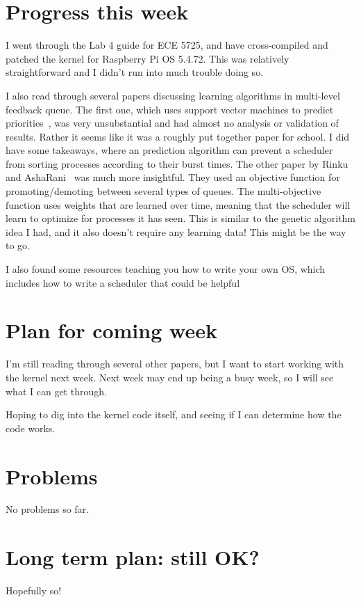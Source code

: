 \documentclass[12pt]{article}
\def\ind{\hspace*{0.3in}}
\begin{document}
\setlength{\parindent}{0in}
\addtolength{\parskip}{0.1cm}
\setlength{\fboxrule}{.5mm}\setlength{\fboxsep}{1.2mm}
\newlength{\boxlength}\setlength{\boxlength}{\textwidth}
\addtolength{\boxlength}{-4mm}
\begin{center}
\end{center}
\vspace{2mm}

\section*{Progress this week}
\ind I went through the Lab 4 guide for ECE 5725, and have cross-compiled and patched the kernel for Raspberry Pi OS 5.4.72. This was relatively straightforward and I didn't run into much trouble doing so. 

I also read through several papers discussing learning algorithms in multi-level feedback queue. The first one, which uses support vector machines to predict priorities~\cite{satyanarayanaImprovedProcessScheduling2018}, was very unsubstantial and had almost no analysis or validation of results. Rather it seems like it was a roughly put together paper for school. I did have some takeaways, where an prediction algorithm can prevent a scheduler from sorting processes according to their burst times. The other paper by Rinku and AshaRani~\cite{rinkuReinforcementLearningBased2020} was much more insightful. They used an objective function for promoting/demoting between several types of queues. The multi-objective function uses weights that are learned over time, meaning that the scheduler will learn to optimize for processes it has seen. This is similar to the genetic algorithm idea I had, and it also doesn't require any learning data! This might be the way to go.

I also found some resources teaching you how to write your own OS, which includes how to write a scheduler that could be helpful~\cite{sandlerPart08Processes}~\cite{Scheduler}

\section*{Plan for coming week}
\ind I'm still reading through several other papers, but I want to start working with the kernel next week. Next week may end up being a busy week, so I will see what I can get through. 

Hoping to dig into the kernel code itself, and seeing if I can determine how the code works.
\section*{Problems}
No problems so far.
\section*{Long term plan: still OK?}
Hopefully so! 



\end{document}
